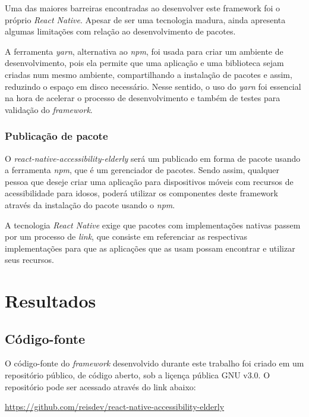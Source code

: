 \documentclass[
	12pt,				    %
	openright,			    %
	oneside,			    %
	a4paper,			    %
    sumario=tradicional,    %
	english,			    %
	brazil,				    %
	]{abntex2}              %
\begin{document}
Uma das maiores barreiras encontradas ao desenvolver este framework foi o próprio \textit{React Native}. Apesar de ser uma tecnologia madura, ainda apresenta algumas limitações com relação ao desenvolvimento de pacotes.

\par

A ferramenta \textit{yarn}, alternativa ao \textit{npm}, foi usada para criar um ambiente de desenvolvimento, pois ela permite que uma aplicação e uma biblioteca sejam criadas num mesmo ambiente, compartilhando a instalação de pacotes e assim, reduzindo o espaço em disco necessário. Nesse sentido, o uso do \textit{yarn} foi essencial na hora de acelerar o processo de desenvolvimento e também de testes para validação do \textit{framework}.

\subsection{Publicação de pacote}

O \textit{react-native-accessibility-elderly} será um publicado em forma de pacote usando a ferramenta \textit{npm}, que é um gerenciador de pacotes. Sendo assim, qualquer pessoa que deseje criar uma aplicação para dispositivos móveis com recursos de acessibilidade para idosos, poderá utilizar os componentes deste framework através da instalação do pacote usando o \textit{npm}.

A tecnologia \textit{React Native} exige que pacotes com implementações nativas passem por um processo de \textit{link}, que consiste em referenciar as respectivas implementações para que as aplicações que as usam possam encontrar e utilizar seus recursos.

\chapter{Resultados}\label{sec:resultados}

\section{Código-fonte}

O código-fonte do \textit{framework} desenvolvido durante este trabalho foi criado em um repositório público, de código aberto, sob a liçença pública GNU v3.0. O repositório pode ser acessado através do link abaixo:

\href{https://github.com/reisdev/react-native-accessibility-elderly}{https://github.com/reisdev/react-native-accessibility-elderly}
\end{document}
